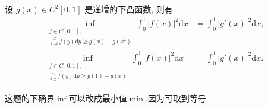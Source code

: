\documentclass[../../main.tex]{subfiles}
\begin{document}
\begin{proposition}\label{proposition:下凸函数积分不等式习题加强}
设 $g(x) \in C^2[0,1]$ 是递增的下凸函数, 则有
\begin{align}
\inf_{\substack{f \in C[0,1], \\ \int_{x^2}^x f(y) \mathrm{d}y \geqslant g(x) - g(x^2)}} \int_0^1 |f(x)|^2 \mathrm{d}x &= \int_0^1 |g'(x)|^2 \mathrm{d}x, \label{17.17eq1} \\
\inf_{\substack{f \in C[0,1], \\ \int_x^1 f(y) \mathrm{d}y \geqslant g(1) - g(x)}} \int_0^1 |f(x)|^2 \mathrm{d}x &= \int_0^1 |g'(x)|^2 \mathrm{d}x. \label{17.17eq2}
\end{align}
\end{proposition}
\begin{note}
这题的下确界$\inf$可以改成最小值$\min$,因为可取到等号.
\end{note}
\end{document}
